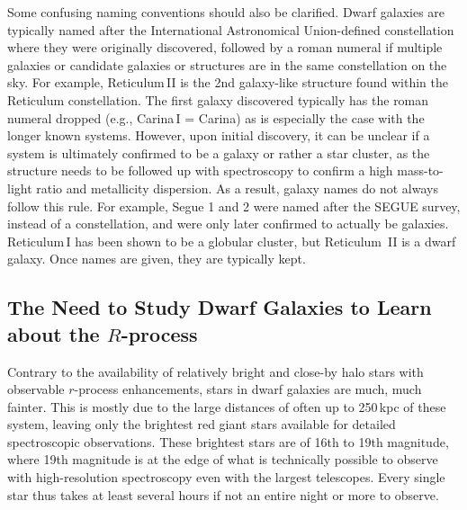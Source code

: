 \documentclass[letterpaper]{article}
\begin{document}
Some confusing naming conventions should also be clarified. Dwarf galaxies are typically named after the International Astronomical Union-defined constellation where they were originally discovered, followed by a roman numeral if multiple galaxies or candidate galaxies or structures are in the same constellation on the sky. For example,  Reticulum\,II is the 2nd galaxy-like structure found within the Reticulum constellation. The first galaxy discovered typically has the roman numeral dropped (e.g., Carina\,I = Carina) as is especially the case with the longer known systems. However, upon initial discovery, it can be unclear if a system is ultimately confirmed to be a galaxy or rather a star cluster, as the structure needs to be followed up with spectroscopy to confirm a high mass-to-light ratio and metallicity dispersion. As a result, galaxy names do not always follow this rule. For example, Segue 1 and 2 were named after the SEGUE survey, instead of a constellation, and were only later confirmed to actually be galaxies. Reticulum\,I has been shown to be a globular cluster, but Reticulum~II is a dwarf galaxy. Once names are given, they are typically kept.


\subsection{The Need to Study Dwarf Galaxies to Learn about the $R$-process}

Contrary to the availability of relatively bright and close-by halo stars with observable $r$-process enhancements, stars in dwarf galaxies are much, much fainter. This is mostly due to the large distances of often up to 250\,kpc of these system, leaving only the brightest red giant stars available for detailed spectroscopic observations. These brightest stars  are of 16th to 19th magnitude, where 19th magnitude is at the edge of what is technically possible to observe with high-resolution spectroscopy even with the largest telescopes.
Every single star thus takes at least several hours if not an entire night or more to observe. 
\end{document}
